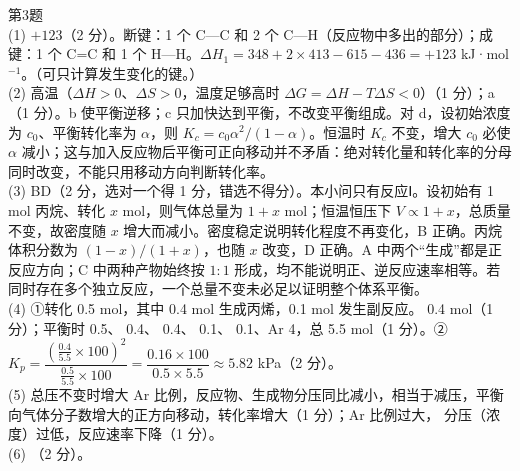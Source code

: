 \begin{jiexilist}
\item 第3题\\
(1) $+123$（2 分）。断键：1 个 C—C 和 2 个 C—H（反应物中多出的部分）；成键：1 个 C=C 和 1 个 H—H。$\Delta H_1=348+2\times413-615-436=+123$ kJ·mol$^{-1}$。（可只计算发生变化的键。）\\
(2) 高温（$\Delta H>0$、$\Delta S>0$，温度足够高时 $\Delta G=\Delta H-T\Delta S<0$）（1 分）；a（1 分）。b 使平衡逆移；c 只加快达到平衡，不改变平衡组成。对 d，设初始浓度为 $c_0$、平衡转化率为 $\alpha$，则 $K_c=c_0\alpha^2/(1-\alpha)$。恒温时 $K_c$ 不变，增大 $c_0$ 必使 $\alpha$ 减小；这与加入反应物后平衡可正向移动并不矛盾：绝对转化量和转化率的分母同时改变，不能只用移动方向判断转化率。\\
(3) BD（2 分，选对一个得 1 分，错选不得分）。本小问只有反应Ⅰ。设初始有 1 mol 丙烷、转化 $x$ mol，则气体总量为 $1+x$ mol；恒温恒压下 $V\propto1+x$，总质量不变，故密度随 $x$ 增大而减小。密度稳定说明转化程度不再变化，B 正确。丙烷体积分数为 $(1-x)/(1+x)$，也随 $x$ 改变，D 正确。A 中两个“生成”都是正反应方向；C 中两种产物始终按 $1:1$ 形成，均不能说明正、逆反应速率相等。若同时存在多个独立反应，一个总量不变未必足以证明整个体系平衡。\\
(4) ①转化  0.5 mol，其中 0.4 mol 生成丙烯，0.1 mol 发生副反应。 0.4 mol（1 分）；平衡时  0.5、 0.4、 0.4、 0.1、 0.1、Ar 4，总 5.5 mol（1 分）。②$K_p=\dfrac{(\frac{0.4}{5.5}\times100)^2}{\frac{0.5}{5.5}\times100}=\dfrac{0.16\times100}{0.5\times5.5}\approx5.82$ kPa（2 分）。\\
(5) 总压不变时增大 Ar 比例，反应物、生成物分压同比减小，相当于减压，平衡向气体分子数增大的正方向移动，转化率增大（1 分）；Ar 比例过大， 分压（浓度）过低，反应速率下降（1 分）。\\
(6) （2 分）。


\end{jiexilist}
